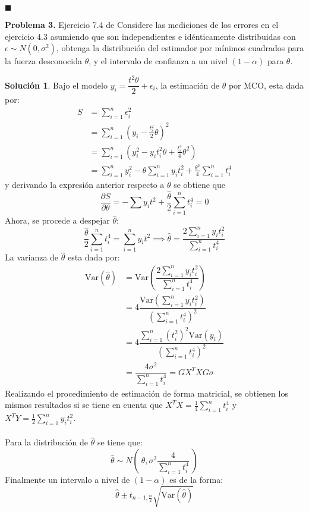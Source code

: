 \documentclass[12pt]{article}
\theoremstyle{plain}
\theoremstyle{definition}
\theoremstyle{definition}
\theoremstyle{definition}
\newtheorem*{solution}{Solución}
\newcommand{\var}{\text{Var}}
\begin{document}
\begin{flushright}
$\blacksquare$
\end{flushright}
\noindent \textbf{Problema 3.} Ejercicio 7.4 de \cite{ravishanker2001first} Considere las mediciones de los errores en el ejercicio 4.3 asumiendo que son independientes e idénticamente distribuidas con  $\epsilon\sim N(0,\sigma^{2})$, obtenga la distribución del estimador por mínimos cuadrados para la fuerza desconocida $\theta$, y el intervalo de confianza a un nivel $(1-\alpha)$ para $\theta$.\\ 
\begin{solution}
Bajo el modelo  $y_i=\dfrac{t^2\theta}{2}+\epsilon_i$, la estimación de $\theta$ por MCO, esta dada por:
\begin{align*}
    S &=\sum^{n}_{i=1} \epsilon_i^2\\ &= \sum_{i=1}^{n} \left( y_i - \frac{t^{2}_{i}}{2}\theta \right)^2 \\
    &= \sum_{i=1}^{n} \left(y_{i}^{2}-y_i t_{i}^{2}\theta+\frac{t_{i}^4}{4}\theta^2 \right)\\ &= \sum_{i=1}^{n} y_i^2 -\theta\sum_{i=1}^{n} y_i t_{i}^{2}+\frac{\theta^2}{4}\sum_{i=1}^{n}t_{i}^{4}
\end{align*}
y derivando la expresión anterior respecto a  $\theta$ se obtiene que
$$\frac{\partial S}{\partial\theta}= - \sum y_{i}t^2+\frac{\hat{\theta}}{2}\sum_{i=1}^{n}t_{i}^4=0$$
Ahora, se procede a despejar $\hat{\theta}$:
$$\frac{\hat{\theta}}{2}\sum_{i=1}^{n}t_{i}^4=\sum_{i=1}^{n} y_{i}t^2 \implies
\hat{\theta}=\dfrac{2\sum_{i=1}^{n}y_{i}t_{i}^2}{\sum_{i=1}^{n}t_{i}^{4}}$$
La varianza de $\hat{\theta}$  esta dada por:
\begin{align*}
\var(\hat{\theta}) &=\var(\dfrac{2\sum_{i=1}^{n}y_{i}t_{i}^2}{\sum_{i=1}^{n}t_{i}^{4}}) \\
&=4\dfrac{\var(\sum_{i=1}^{n}y_{i}t_{i}^2)}{(\sum_{i=1}^{n}t_{i}^{4})^2}\\ &=4\dfrac{\sum_{i=1}^{n}(t_{i}^2)^2\var(y_{i})}{(\sum_{i=1}^{n}t_{i}^{4})^2} \\
&=\dfrac{4\sigma^2}{\sum_{i=1}^{n}t_{i}^4}=GX^TXG\sigma
\end{align*}
Realizando el procedimiento de estimación de forma matricial, se obtienen los mismos resultados si se tiene en cuenta que $X^TX=\frac{1}{4}\sum_{i=1}^{n}t_{i}^4$ y $X^T Y=\frac{1}{2}\sum_{i=1}^{n}y_{i}t_{i}^2$.\\ \\ 
Para la distribución de $\hat{\theta}$ se tiene que:\\
$$\hat{\theta}\sim N\left( \ \theta, \sigma^2\dfrac{4}{\sum_{i=1}^{n}t_{i}^4}\ \right)$$
Finalmente un intervalo a nivel de $(1-\alpha)$ es de la forma:
$$\hat{\theta}\pm t_{n-1,\frac{\alpha}{2}}\sqrt{\var(\hat{\theta})}$$
\end{solution}
\end{document}

